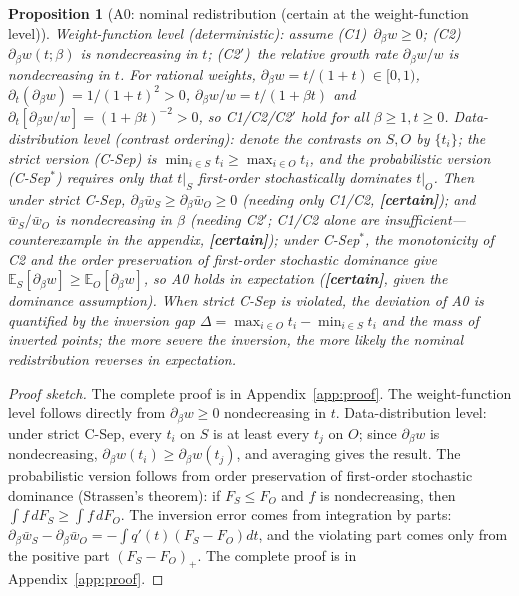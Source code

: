 \documentclass[11pt]{article}
\newtheorem{proposition}{Proposition}[section]
\numberwithin{equation}{section}
\begin{document}
\begin{proposition}[A0: nominal redistribution (certain at the weight-function level)]\label{prop:mechA0}
\emph{Weight-function level (deterministic)}: assume (C1)~$\partial_\beta w\ge0$; (C2)~$\partial_\beta w(t;\beta)$ is nondecreasing in $t$; (C2$'$)~the relative growth rate $\partial_\beta w/w$ is nondecreasing in $t$. For rational weights, $\partial_\beta w=t/(1+t)\in[0,1)$, $\partial_t(\partial_\beta w)=1/(1+t)^2>0$, $\partial_\beta w/w=t/(1+\beta t)$ and $\partial_t[\partial_\beta w/w]=(1+\beta t)^{-2}>0$, so C1/C2/C2$'$ hold for all $\beta\ge1,t\ge0$. \emph{Data-distribution level (contrast ordering)}: denote the contrasts on $S,O$ by $\{t_i\}$; the strict version (C-Sep) is $\min_{i\in S}t_i\ge\max_{i\in O}t_i$, and the probabilistic version (C-Sep$^*$) requires only that $t|_S$ first-order stochastically dominates $t|_O$. Then under strict C-Sep, $\partial_\beta\bar w_S\ge\partial_\beta\bar w_O\ge0$ (needing only C1/C2, \textbf{[certain]}); and $\bar w_S/\bar w_O$ is nondecreasing in $\beta$ (needing C2$'$; C1/C2 alone are insufficient---counterexample in the appendix, \textbf{[certain]}); under C-Sep$^*$, the monotonicity of C2 and the order preservation of first-order stochastic dominance \cite{Strassen1965} give $\mathbb E_S[\partial_\beta w]\ge\mathbb E_O[\partial_\beta w]$, so A0 holds \emph{in expectation} (\textbf{[certain]}, given the dominance assumption). When strict C-Sep is violated, the deviation of A0 is quantified by the inversion gap $\Delta=\max_{i\in O}t_i-\min_{i\in S}t_i$ and the mass of inverted points; the more severe the inversion, the more likely the nominal redistribution reverses in expectation.
\end{proposition}
\begin{proof}[Proof sketch] The complete proof is in Appendix~\ref{app:proof}.
The weight-function level follows directly from $\partial_\beta w\ge0$ nondecreasing in $t$. Data-distribution level: under strict C-Sep, every $t_i$ on $S$ is at least every $t_j$ on $O$; since $\partial_\beta w$ is nondecreasing, $\partial_\beta w(t_i)\ge\partial_\beta w(t_j)$, and averaging gives the result. The probabilistic version follows from order preservation of first-order stochastic dominance (Strassen's theorem): if $F_S\le F_O$ and $f$ is nondecreasing, then $\int f\,dF_S\ge\int f\,dF_O$. The inversion error comes from integration by parts: $\partial_\beta\bar w_S-\partial_\beta\bar w_O=-\int q'(t)(F_S-F_O)dt$, and the violating part comes only from the positive part $(F_S-F_O)_+$. The complete proof is in Appendix~\ref{app:proof}.
\end{proof}
\end{document}
